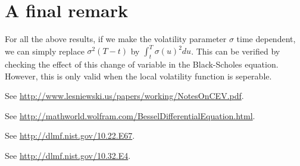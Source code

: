 \documentclass[12pt]{article}
\begin{document}
\section{A final remark}

  For all the above results, if we make the volatility parameter $\sigma$ time dependent, we can simply replace $\sigma^2(T-t)$
  by $\int_t^T\sigma(u)^2du$. This can be verified by checking the effect of this change of variable in the Black-Scholes equation.
  However, this is only valid when the local volatility function is seperable.




\begin{thebibliography}{99}
    See \url{http://www.lesniewski.us/papers/working/NotesOnCEV.pdf}.

    See \url{http://mathworld.wolfram.com/BesselDifferentialEquation.html}.

    See \url{http://dlmf.nist.gov/10.22.E67}.

    See \url{http://dlmf.nist.gov/10.32.E4}.
\end{thebibliography}
\end{document}
